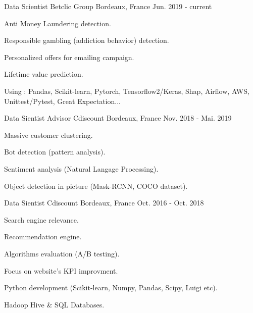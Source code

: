 

\begin{cventries}

  \cventry
    {Data Scientist} %
    {Betclic Group} %
    {Bordeaux, France} %
    {Jun. 2019 - current} %
    {
      \begin{cvitems} %
        \item {Anti Money Laundering detection.}
        \item {Responsible gambling (addiction behavior) detection.}
        \item {Personalized offers for emailing campaign.}
        \item {Lifetime value prediction.}
      \end{cvitems}
    \vspace{9} 
    Using : Pandas, Scikit-learn, Pytorch, Tensorflow2/Keras, Shap, Airflow, AWS, Unittest/Pytest, Great Expectation...  
    }

  \cventry
    {Data Sientist Advisor} %
    {Cdiscount} %
    {Bordeaux, France} %
    {Nov. 2018 - Mai. 2019} %
    {
       \begin{cvitems} %
        \item {Massive customer clustering.}
        \item {Bot detection (pattern analysis).}
        \item {Sentiment analysis (Natural Langage Processing).}
        \item {Object detection in picture (Mask-RCNN, COCO dataset).}
      \end{cvitems}
    }

  \cventry
    {Data Sientist} %
    {Cdiscount} %
    {Bordeaux, France} %
    {Oct. 2016 - Oct. 2018} %
    {
      \begin{cvitems} %
        \item {Search engine relevance.}
        \item {Recommendation engine.}
        \item {Algorithms evaluation (A/B testing).}
        \item {Focus on website's KPI improvment.}
        \item {Python development (Scikit-learn, Numpy, Pandas, Scipy, Luigi etc).}
        \item {Hadoop Hive \& SQL Databases.}
      \end{cvitems}
    }


\end{cventries}
